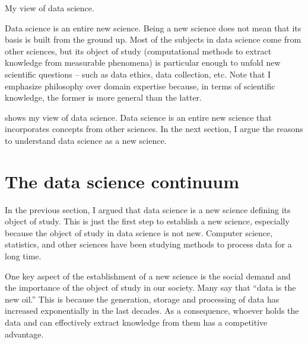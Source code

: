 \begin{figurebox}[label=fig:myview]{My view of data science.}
  \centering
  \tcblower
    Data science is an entire new science.  Being a new science
    does not mean that its basis is built from the ground up.  Most of the subjects in
    data science come from other sciences, but its object of study (computational methods
    to extract knowledge from measurable phenomena) is particular enough to unfold
    new scientific questions -- such as data ethics, data collection, etc.
    Note that I emphasize philosophy over domain expertise because, in terms
    of scientific knowledge, the former is more general than the latter.
\end{figurebox}

 shows my view of data science.  Data science is an entire new science
that incorporates concepts from other sciences.  In the next section, I argue the reasons
to understand data science as a new science.

\section{The data science continuum}

In the previous section, I argued that data science is a new science defining its object
of study.  This is just the first step to establish a new science, especially because the
object of study in data science is not new.  Computer science, statistics, and other
sciences have been studying methods to process data for a long time.

One key aspect of the establishment of a new science is the social demand and the
importance of the object of study in our society.  Many say that ``data is the new oil.''
This is because the generation, storage and processing of data has increased exponentially
in the last decades.  As a consequence, whoever holds the data and can effectively extract
knowledge from them has a competitive advantage.

